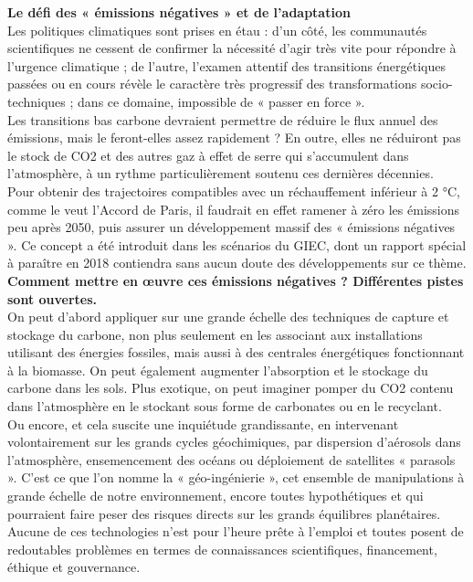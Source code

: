 \documentclass[8pt]{article}
\begin{document}
\textbf{Le défi des « émissions négatives » et de l’adaptation}\\

Les politiques climatiques sont prises en étau : d’un côté, les communautés scientifiques ne cessent de confirmer la nécessité d’agir très vite pour répondre à l’urgence climatique ; de l’autre, l’examen attentif des transitions énergétiques passées ou en cours révèle le caractère très progressif des transformations socio-techniques ; dans ce domaine, impossible de « passer en force ».\\


Les transitions bas carbone devraient permettre de réduire le flux annuel des émissions, mais le feront-elles assez rapidement ? En outre, elles ne réduiront pas le stock de CO2 et des autres gaz à effet de serre qui s’accumulent dans l’atmosphère, à un rythme particulièrement soutenu ces dernières décennies.\\


Pour obtenir des trajectoires compatibles avec un réchauffement inférieur à 2 °C, comme le veut l’Accord de Paris, il faudrait en effet ramener à zéro les émissions peu après 2050, puis assurer un développement massif des « émissions négatives ». Ce concept a été introduit dans les scénarios du GIEC, dont un rapport spécial à paraître en 2018 contiendra sans aucun doute des développements sur ce thème. \\

\newpage
\textbf{Comment mettre en œuvre ces émissions négatives ? Différentes pistes sont ouvertes.}\\

On peut d’abord appliquer sur une grande échelle des techniques de capture et stockage du carbone, non plus seulement en les associant aux installations utilisant des énergies fossiles, mais aussi à des centrales énergétiques fonctionnant à la biomasse. On peut également augmenter l’absorption et le stockage du carbone dans les sols. Plus exotique, on peut imaginer pomper du CO2 contenu dans l’atmosphère en le stockant sous forme de carbonates ou en le recyclant.\\

Ou encore, et cela suscite une inquiétude grandissante, en intervenant volontairement sur les grands cycles géochimiques, par dispersion d’aérosols dans l’atmosphère, ensemencement des océans ou déploiement de satellites « parasols ». C’est ce que l’on nomme la « géo-ingénierie », cet ensemble de manipulations à grande échelle de notre environnement, encore toutes hypothétiques et qui pourraient faire peser des risques directs sur les grands équilibres planétaires.
Aucune de ces technologies n’est pour l’heure prête à l’emploi et toutes posent de redoutables problèmes en termes de connaissances scientifiques, financement, éthique et gouvernance.\\
\end{document}
